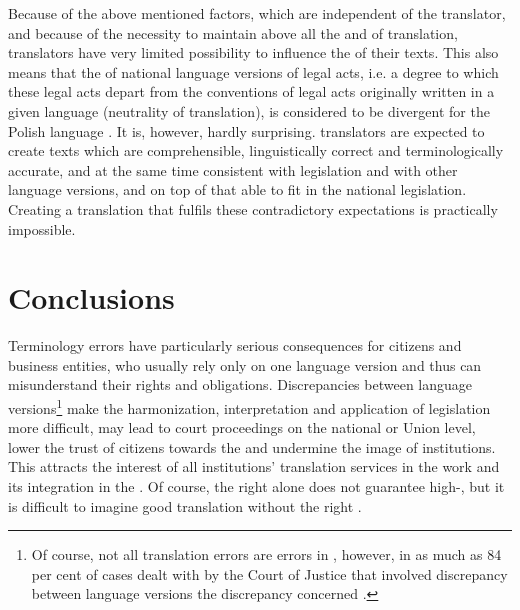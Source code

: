 \documentclass[output=paper]{langsci/langscibook}
\begin{document}
Because of the above mentioned factors, which are independent of the translator, and because of the necessity to maintain above all the  and  of translation, translators have very limited possibility to influence the  of their texts. This also means that the  of national language versions of  legal acts, i.e. a degree to which these legal acts depart from the conventions of legal acts originally written in a given language (neutrality of translation), is considered to be divergent for the Polish language \citep[289--292]{Biel2014}. It is, however, hardly surprising.  translators are expected to create texts which are comprehensible, linguistically correct and terminologically accurate, and at the same time consistent with  legislation and with other language versions, and on top of that able to fit in the national legislation. Creating a translation that fulfils these contradictory expectations is practically impossible.

  
\section{Conclusions}\label{sec:stefaniak:4}

Terminology errors have particularly serious consequences for citizens and business entities, who usually rely only on one language version and thus can misunderstand their rights and obligations. Discrepancies between language versions\footnote{Of course, not all translation errors are errors in , however, in as much as 84 per cent of cases dealt with by the Court of Justice that involved discrepancy between language versions the discrepancy concerned  \citep[28]{DGT2012}.} make the harmonization, interpretation and application of  legislation more difficult, may lead to court proceedings on the national or Union level, lower the trust of citizens towards the  and undermine the image of  institutions. This attracts the interest of all  institutions’ translation services in the  work and its integration in the . Of course, the right  alone does not guarantee high-, but it is difficult to imagine good translation without the right .


\sloppy
\printbibliography[heading=subbibliography,notkeyword=this] 
\end{document}
